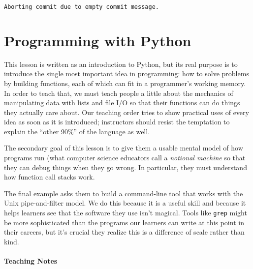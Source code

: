 \documentclass[]{book}
\newcommand{\gdef}[2]{\emph{#2}}
\begin{document}
\begin{verbatim}
Aborting commit due to empty commit message.
\end{verbatim}

\section{Programming with Python}

This lesson is written as an introduction to Python, but its real
purpose is to introduce the single most important idea in programming:
how to solve problems by building functions, each of which can fit in a
programmer's working memory. In order to teach that, we must teach
people a little about the mechanics of manipulating data with lists and
file I/O so that their functions can do things they actually care about.
Our teaching order tries to show practical uses of every idea as soon as
it is introduced; instructors should resist the temptation to explain
the ``other 90\%'' of the language as well.

The secondary goal of this lesson is to give them a usable mental model
of how programs run (what computer science educators call a
\gdef{g:notional-machine}{notional machine} so that they can debug
things when they go wrong. In particular, they must understand how
function call stacks work.

The final example asks them to build a command-line tool that works with
the Unix pipe-and-filter model. We do this because it is a useful skill
and because it helps learners see that the software they use isn't
magical. Tools like \texttt{grep} might be more sophisticated than the
programs our learners can write at this point in their careers, but it's
crucial they realize this is a difference of scale rather than kind.

\mbox{}\paragraph{Teaching Notes}
\end{document}
